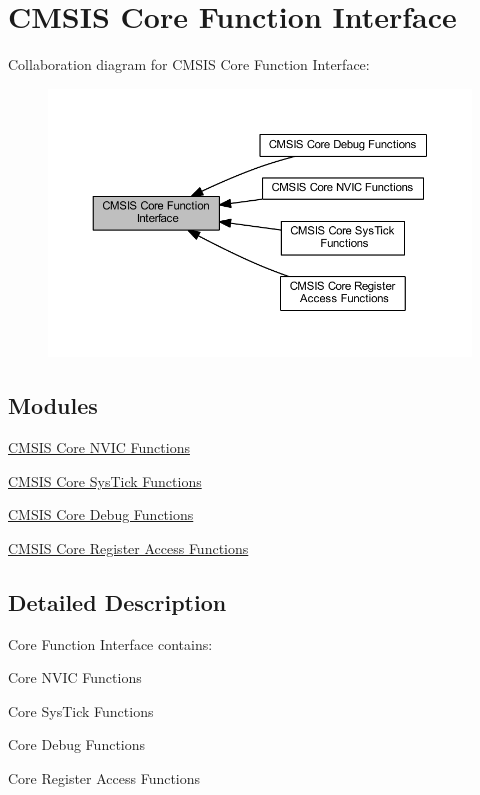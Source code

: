 \hypertarget{group___c_m_s_i_s___core___function_interface}{}\section{C\+M\+S\+IS Core Function Interface}
\label{group___c_m_s_i_s___core___function_interface}
Collaboration diagram for C\+M\+S\+IS Core Function Interface\+:
\nopagebreak
\begin{figure}[H]
\begin{center}
\leavevmode
\includegraphics[width=350pt]{group___c_m_s_i_s___core___function_interface}
\end{center}
\end{figure}
\subsection*{Modules}
\begin{DoxyCompactItemize}
\item 
\hyperlink{group___c_m_s_i_s___core___n_v_i_c_functions}{C\+M\+S\+I\+S Core N\+V\+I\+C Functions}
\item 
\hyperlink{group___c_m_s_i_s___core___sys_tick_functions}{C\+M\+S\+I\+S Core Sys\+Tick Functions}
\item 
\hyperlink{group___c_m_s_i_s__core___debug_functions}{C\+M\+S\+I\+S Core Debug Functions}
\item 
\hyperlink{group___c_m_s_i_s___core___reg_acc_functions}{C\+M\+S\+I\+S Core Register Access Functions}
\end{DoxyCompactItemize}


\subsection{Detailed Description}
Core Function Interface contains\+:
\begin{DoxyItemize}
\item Core N\+V\+IC Functions
\item Core Sys\+Tick Functions
\item Core Debug Functions
\item Core Register Access Functions 
\end{DoxyItemize}